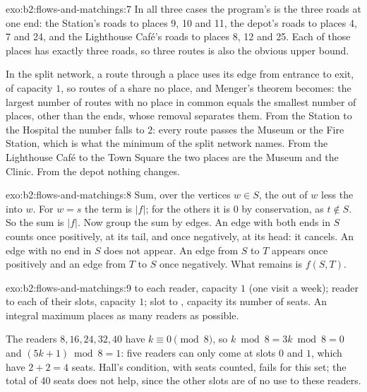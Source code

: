 \begin{solution}{exo:b2:flows-and-matchings:7}
In all three cases the program's  is the three roads at one end: the Station's roads to places 9, 10 and 11, the
depot's roads to places 4, 7 and 24, and the Lighthouse Caf\'e's roads to places 8, 12 and 25. Each of those places has
exactly three roads, so three routes is also the obvious upper bound.


In the split network, a route through a place uses its edge from entrance to exit, of capacity $1$, so routes of a
 share no place, and Menger's theorem becomes: the largest number of routes with no place in common equals the
smallest number of places, other than the ends, whose removal separates them. From the Station to the Hospital the number falls to
$2$: every route passes the Museum or the Fire Station, which is what the minimum  of the split network names. From
the Lighthouse Caf\'e to the Town Square the two places are the Museum and the Clinic. From the depot nothing changes.
\end{solution}

\begin{solution}{exo:b2:flows-and-matchings:8}
Sum, over the vertices $w \in S$, the  out of $w$ less the  into $w$. For $w = s$ the term is $|f|$; for the
others it is $0$ by conservation, as $t \notin S$. So the sum is $|f|$. Now group the sum by edges. An edge with both
ends in $S$ counts once positively, at its tail, and once negatively, at its head: it cancels. An edge with no end in $S$
does not appear. An edge from $S$ to $T$ appears once positively and an edge from $T$ to $S$ once negatively. What remains
is $f(S, T)$.
\end{solution}

\begin{solution}{exo:b2:flows-and-matchings:9}
 to each reader, capacity $1$ (one visit a week); reader to each of their slots, capacity $1$; slot to ,
capacity its number of seats. An integral maximum  places as many readers as possible.


The readers $8, 16, 24, 32, 40$ have $k \equiv 0 \pmod 8$, so $k \bmod 8 = 3k \bmod 8 = 0$ and $(5k + 1) \bmod 8 = 1$:
five readers can only come at slots $0$ and $1$, which have $2 + 2 = 4$ seats. Hall's condition, with seats counted,
fails for this set; the total of 40 seats does not help, since the other slots are of no use to these readers.
\end{solution}


